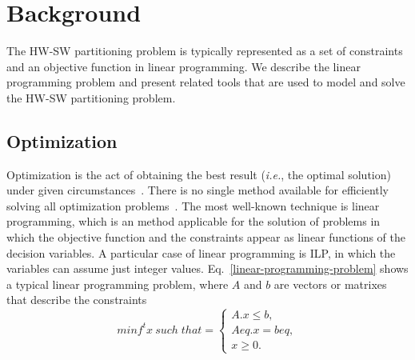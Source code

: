 \section{Background}
\label{background}

The HW-SW partitioning problem is typically represented as a set of constraints and an objective function in linear programming. We describe the linear programming problem and present related tools that are used to model and solve the HW-SW partitioning problem.

\subsection{Optimization}
\label{Optimization}

Optimization is the act of obtaining the best result ({\it i.e.}, the optimal solution) under given circumstances~\cite{Rao2009}. 
There is no single method available for efficiently solving all optimization problems~\cite{Rao2009}. The most well-known technique is linear programming, which is an method applicable for the solution of problems in which the objective function and the constraints appear as linear functions of the decision variables. A particular case of linear programming is ILP, in which the variables can assume just integer values. Eq.~\ref{linear-programming-problem} shows a typical linear programming problem, where $A$ and $b$ are vectors or matrixes that describe the constraints
\begin{equation}
\label{linear-programming-problem}
  minf^t x \: such \; that  = 
  \begin{cases}
    A.x \leq b, \\ 
    Aeq.x = beq, \\ 
    x \geq 0.
  \end{cases}
\end{equation}

